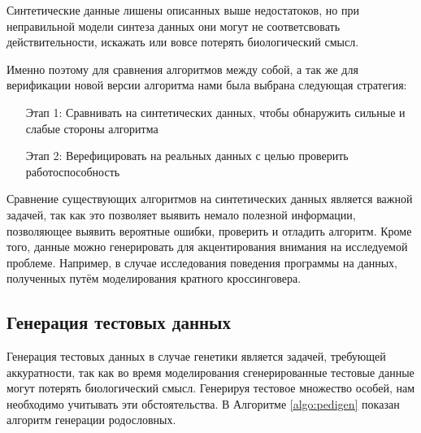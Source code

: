 \documentclass{matmex-diploma-custom}
\begin{document}
Синтетические данные лишены описанных выше недостатоков, но при
неправильной модели синтеза данных они могут не соответсвовать
действительности, искажать или вовсе потерять биологический смысл.

Именно поэтому для сравнения алгоритмов между собой, а так же для
верификации новой версии алгоритма нами была выбрана следующая
стратегия:

\begin{enumerate}
\item[Этап 1:] Сравнивать на синтетических данных, чтобы обнаружить
  сильные и слабые стороны алгоритма
\item[Этап 2:] Верефицировать на реальных данных с целью проверить
  работоспособность
\end{enumerate}

Сравнение существующих алгоритмов на синтетических данных является
важной задачей, так как это позволяет выявить немало полезной
информации, позволяющее выявить вероятные ошибки, проверить и отладить
алгоритм. Кроме того, данные можно генерировать для акцентирования
внимания на исследуемой проблеме. Например, в случае исследования
поведения программы на данных, полученных путём моделирования кратного
кроссинговера.

\subsection{Генерация тестовых данных}

Генерация тестовых данных в случае генетики является задачей,
требующей аккуратности, так как во время моделирования сгенерированные
тестовые данные могут потерять биологический смысл. Генерируя тестовое
множество особей, нам необходимо учитывать эти обстоятельства. В
Алгоритме \ref{algo:pedigen} показан алгоритм генерации родословных.
\end{document}
